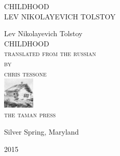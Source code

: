 
\newlength{\drop}\setlength{\drop}{0.12\textheight}

\newcommand*{\firsttitle}{\begingroup
\centering
\vspace*{3em}
{\Large CHILDHOOD}\\[\baselineskip]
{\Large LEV NIKOLAYEVICH TOLSTOY}
\vfill\null
\endgroup}

\newcommand*{\titleAM}{\begingroup
\centering
\vspace*{\drop}
{\large Lev Nikolayevich Tolstoy}\\[\baselineskip]
{\Huge CHILDHOOD}\\[\baselineskip]
{\scshape translated from the russian}\\
{\scshape by}\\
{\scshape chris tessone}\\
\vfill%
{\scshape \includegraphics[width=1.5cm, height=1.5cm]{taman-press.png}}\\[0.5\baselineskip]
{\small\scshape the taman press}\par
{\small Silver Spring, Maryland}\par
{\small\scshape 2015}\par
\endgroup}

\firsttitle
\thispagestyle{empty}
\clearpage

\newpage\null\thispagestyle{empty}\newpage

\titleAM
\thispagestyle{empty}
\clearpage 

